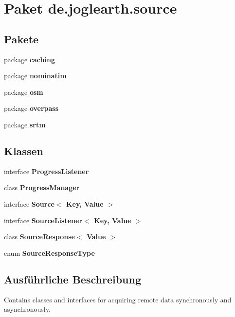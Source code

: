 \section{Paket de.\-joglearth.\-source}
\label{namespacede_1_1joglearth_1_1source}
\subsection*{Pakete}
\begin{DoxyCompactItemize}
\item 
package {\bf caching}
\item 
package {\bf nominatim}
\item 
package {\bf osm}
\item 
package {\bf overpass}
\item 
package {\bf srtm}
\end{DoxyCompactItemize}
\subsection*{Klassen}
\begin{DoxyCompactItemize}
\item 
interface {\bf Progress\-Listener}
\item 
class {\bf Progress\-Manager}
\item 
interface {\bf Source$<$ Key, Value $>$}
\item 
interface {\bf Source\-Listener$<$ Key, Value $>$}
\item 
class {\bf Source\-Response$<$ Value $>$}
\item 
enum {\bf Source\-Response\-Type}
\end{DoxyCompactItemize}


\subsection{Ausführliche Beschreibung}
Contains classes and interfaces for acquiring remote data synchronously and asynchronously. 